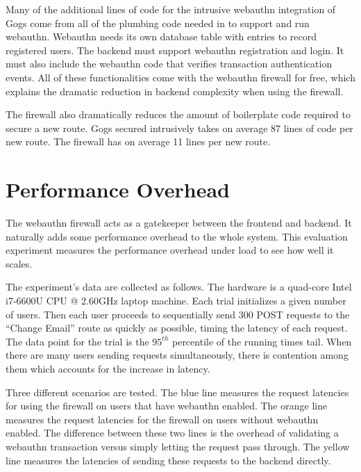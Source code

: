 Many of the additional lines of code for the intrusive webauthn integration of Gogs come from all of the plumbing code needed in to support and run webauthn. Webauthn needs its own database table with entries to record registered users. The backend must support webauthn registration and login. It must also include the webauthn code that verifies transaction authentication events. All of these functionalities come with the webauthn firewall for free, which explains the dramatic reduction in backend complexity when using the firewall.

The firewall also dramatically reduces the amount of boilerplate code required to secure a new route. Gogs secured intrusively takes on average 87 lines of code per new route. The firewall has on average 11 lines per new route.



\section{Performance Overhead}

The webauthn firewall acts as a gatekeeper between the frontend and backend. It naturally adds some performance overhead to the whole system. This evaluation experiment measures the performance overhead under load to see how well it scales. 

The experiment's data are collected as follows. The hardware is a quad-core Intel i7-6600U CPU @ 2.60GHz laptop machine. Each trial initializes a given number of users. Then each user proceeds to sequentially send 300 POST requests to the ``Change Email'' route as quickly as possible, timing the latency of each request. The data point for the trial is the $95^{th}$ percentile of the running times tail. When there are many users sending requests simultaneously, there is contention among them which accounts for the increase in latency.

Three different scenarios are tested. The blue line measures the request latencies for using the firewall on users that have webauthn enabled. The orange line measures the request latencies for the firewall on users without webauthn enabled. The difference between these two lines is the overhead of validating a webauthn transaction versus simply letting the request pass through. The yellow line measures the latencies of sending these requests to the backend directly.

